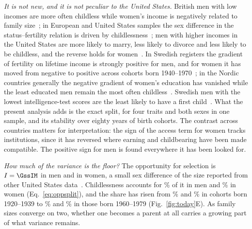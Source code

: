 \emph{It is not new, and it is not peculiar to the United States.} British men with low incomes are more often childless
while women's income is negatively related to family size~\cite{nettle2008}; in European and United States samples the sex
difference in the status--fertility relation is driven by childlessness~\cite{fieder2007,barthold2012,hopcroft2006,weeden2006}; men
with higher incomes in the United States are more likely to marry, less likely to divorce and less likely to be
childless, and the reverse holds for women~\cite{hopcroft2021}. In Swedish registers the gradient of fertility on lifetime income is
strongly positive for men, and for women it has moved from negative to positive across cohorts born 1940--1970~\cite{kolk2023};
in the Nordic countries generally the negative gradient of women's education has vanished while the least educated men
remain the most often childless~\cite{jalovaara2019}. Swedish men with the lowest intelligence-test scores are the least likely
to have a first child~\cite{kolk2019}. What the present analysis adds is the exact split, for four traits and both sexes in one
sample, and its stability over eighty years of birth cohorts. The contrast across countries matters for interpretation: the
sign of the access term for women tracks institutions, since it has reversed where earning and childbearing have been made compatible. The
positive sign for men is found everywhere it has been looked for.

\emph{How much of the variance is the floor?} The opportunity for selection is $I=\GssIM$ in men and \GssIW{} in women, a small
sex difference of the size reported from other United States data~\cite{jokela2010}. Childlessness accounts for \GssShareM\% of it in
men and \GssShareW\% in women (Eq.~\ref{eq:oppsplit}), and the share has risen from \GssShareMOld\% and \GssShareWOld\% in cohorts
born 1920--1939 to \GssShareMNew\% and \GssShareWNew\% in those born 1960--1979 (Fig.~\ref{fig:today}E). As family sizes converge
on two, whether one becomes a parent at all carries a growing part of what variance remains.

